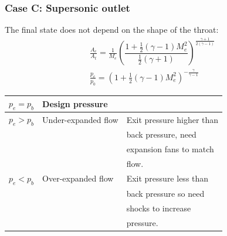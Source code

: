 \documentclass[class=report, crop=false, 12pt,a4paper]{standalone}
\begin{document}
\subsubsection{Case C: Supersonic outlet}
The final state does not depend on the shape of the throat:
\begin{gather}
    \frac{A_e}{A_t} = \frac{1}{M_e}\left(\dfrac{1 + \frac{1}{2}\left(\gamma -1\right)M^2_e}{\frac{1}{2}\left(\gamma + 1\right)}\right)^{\frac{\gamma + 1}{2\left(\gamma -1\right)}}\\
    \frac{p_e}{p_0} = \left(1 + \frac{1}{2}\left(\gamma -1\right)M^2_e\right)^{-\frac{\gamma}{\gamma - 1}}
\end{gather}
\begin{table}[H]
    \centering
    \begin{tabular}{@{}lll@{}}
        \toprule
        $p_e = p_b$ & Design pressure     &                           \\ \midrule
        $p_e > p_b$ & Under-expanded flow & Exit pressure higher than \\
                    &                     & back pressure, need       \\
                    &                     & expansion fans to match   \\ & & flow.                                              \\
        $p_e < p_b$ & Over-expanded flow  & Exit pressure less than   \\
                    &                     & back pressure so need     \\ & & shocks to increase \\ & & pressure. \\ \bottomrule
    \end{tabular}
\end{table}
\end{document}
